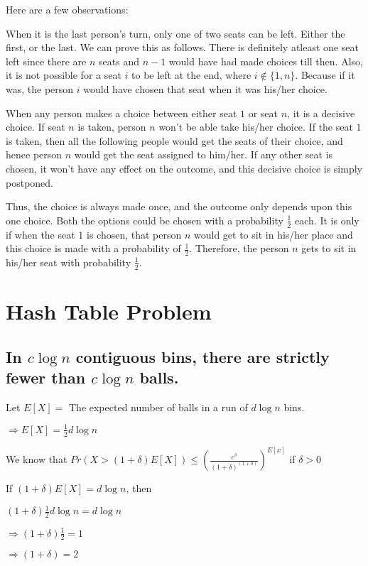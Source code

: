 \documentclass{article}
\begin{document}
Here are a few observations: 

When it is the last person's turn, only one of two seats can be left. 
Either the first, or the last. We can prove this as follows. There is definitely 
atleast one seat left since there are $n$ seats and $n-1$ would have had made 
choices till then. Also, it is not possible for a seat $i$ to be
left at the end, where $i \notin  \{ 1, n \}$. Because if it was, the person $i$ would
have chosen that seat when it was his/her choice. 

When any person makes a choice between either seat $1$ or seat $n$, it is a decisive choice.
If seat $n$ is taken, person $n$ won't be able take his/her choice. If the seat
$1$ is taken, then all the following people would get the seats of their choice, and
hence person $n$ would get the seat assigned to him/her. If any other seat is 
chosen, it won't have any effect on the outcome, and this decisive choice
is simply postponed. 

Thus, the choice is always made once, and the outcome only depends upon this one
choice. Both the options could be chosen with a probability $\frac{1}{2}$ each. It is
only if when the seat $1$ is chosen, that person $n$ would get to sit in his/her place
and this choice is made with a probability of $\frac{1}{2}$. Therefore, the person
$n$ gets to sit in his/her seat with probability $\frac{1}{2}$. 


\clearpage

\section{Hash Table Problem}
\subsection{In $c\log{n}$ contiguous bins, there are strictly
fewer than $c\log{n}$ balls.}

Let $E[X] =$ The expected number of balls in a run of $d\log{n}$ bins.

$\Rightarrow E[X] = \frac{1}{2}d\log{n}$

We know that $Pr(X > (1+\delta)E[X]) \le \left( \frac{e^\delta}{(1+\delta)^{(1+\delta)}} \right)^{E[x]}$ if $\delta > 0$

If $(1+\delta)E[X] = d\log{n}$, then

$(1+\delta)\frac{1}{2}d\log{n} = d\log{n}$

$\Rightarrow (1+\delta)\frac{1}{2} = 1$

$\Rightarrow (1+\delta) = 2$
\end{document}
